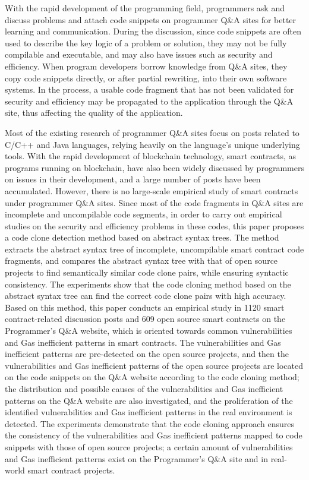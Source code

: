 \begin{abstract*}


With the rapid development of the programming field, programmers ask and discuss problems and attach code snippets on programmer Q\&A sites for better learning and communication. During the discussion, since code snippets are often used to describe the key logic of a problem or solution, they may not be fully compilable and executable, and may also have issues such as security and efficiency. When program developers borrow knowledge from Q\&A sites, they copy code snippets directly, or after partial rewriting, into their own software systems. In the process, a usable code fragment that has not been validated for security and efficiency may be propagated to the application through the Q\&A site, thus affecting the quality of the application.

Most of the existing research of programmer Q\&A sites focus on posts related to C/C++ and Java languages, relying heavily on the language's unique underlying tools. With the rapid development of blockchain technology, smart contracts, as programs running on blockchain, have also been widely discussed by programmers on issues in their development, and a large number of posts have been accumulated. However, there is no large-scale empirical study of smart contracts under programmer Q\&A sites. Since most of the code fragments in Q\&A sites are incomplete and uncompilable code segments, in order to carry out empirical studies on the security and efficiency problems in these codes, this paper proposes a code clone detection method based on abstract syntax trees. The method extracts the abstract syntax tree of incomplete, uncompilable smart contract code fragments, and compares the abstract syntax tree with that of open source projects to find semantically similar code clone pairs, while ensuring syntactic consistency. The experiments show that the code cloning method based on the abstract syntax tree can find the correct code clone pairs with high accuracy. Based on this method, this paper conducts an empirical study in 1120 smart contract-related discussion posts and 609 open source smart contracts on the Programmer's Q\&A website, which is oriented towards common vulnerabilities and Gas inefficient patterns in smart contracts. The vulnerabilities and Gas inefficient patterns are pre-detected on the open source projects, and then the vulnerabilities and Gas inefficient patterns of the open source projects are located on the code snippets on the Q\&A website according to the code cloning method; the distribution and possible causes of the vulnerabilities and Gas inefficient patterns on the Q\&A website are also investigated, and the proliferation of the identified vulnerabilities and Gas inefficient patterns in the real environment is detected. The experiments demonstrate that the code cloning approach ensures the consistency of the vulnerabilities and Gas inefficient patterns mapped to code snippets with those of open source projects; a certain amount of vulnerabilities and Gas inefficient patterns exist on the Programmer's Q\&A site and in real-world smart contract projects.
 
\end{abstract*}
